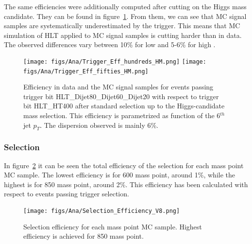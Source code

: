 The same efficiencies were additionally computed after cutting on the Higgs mass candidate. They can be found in figure~\ref{fig:TrigEffPostMH}. From them, we can see that MC signal samples are systematically underestimated by the trigger. This means that MC simulation of HLT applied to MC signal samples is cutting harder than in data. The observed differences vary between 10\% for low \pt and 5-6\% for high \pt.

\begin{figure}[!Hhtbp]
  \begin{center}
    \texttt{[image: figs/Ana/Trigger\_Eff\_hundreds\_HM.png]}
    \texttt{[image: figs/Ana/Trigger\_Eff\_fifties\_HM.png]}
    \caption{Efficiency in data and the MC signal samples for events passing trigger bit HLT\_Dijet80\_Dijet60\_Dijet20 with respect to trigger bit HLT\_HT400 after standard selection up to the Higgs-candidate mass selection. This efficiency is parametrized as function of the 6$^{th}$ jet $p_{T}$. The dispersion observed is mainly 6\%.}
    \label{fig:TrigEffPostMH}
  \end{center}
\end{figure}

\subsubsection{Selection}
\label{sec:seleff}

In figure~\ref{fig:MPEff} it can be seen the total efficiency of the selection for each mass point MC sample. The lowest efficiency is for 600 \GeVcc mass point, around 1\%, while the highest is for 850 \GeVcc mass point, around 2\%. This efficiency has been calculated with respect to events passing trigger selection.  

\begin{figure}[!Hhtbp]
  \begin{center}
    \texttt{[image: figs/Ana/Selection\_Efficiency\_V8.png]}
    \caption{Selection efficiency for each mass point MC sample. Highest efficiency is achieved for 850 \GeVcc mass point.}
    \label{fig:MPEff}
  \end{center}
\end{figure}


